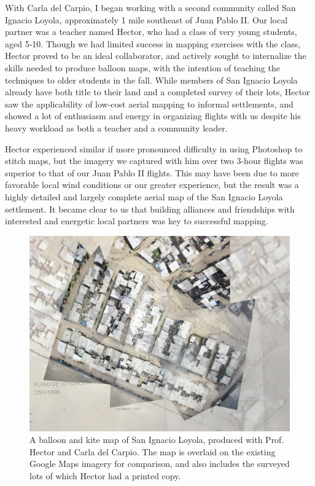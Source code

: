 \documentclass[11pt,oneside,notitlepage]{report}
\begin{document}
{{With Carla del Carpio, I began working with a second community called San Ignacio Loyola, approximately 1 mile southeast of Juan Pablo II. Our local partner was a teacher named Hector, who had a class of very young students, aged 5-10. Though we had limited success in mapping exercises with the class, Hector proved to be an ideal collaborator, and actively sought to internalize the skills needed to produce balloon maps, with the intention of teaching the techniques to older students in the fall. While members of San Ignacio Loyola already have both title to their land and a completed survey of their lots, Hector saw the applicability of low-cost aerial mapping to informal settlements, and showed a lot of enthusiasm and energy in organizing flights with us despite his heavy workload as both a teacher and a community leader. 

Hector experienced similar if more pronounced difficulty in using Photoshop to stitch maps, but the imagery we captured with him over two 3-hour flights was superior to that of our Juan Pablo II flights. This may have been due to more favorable local wind conditions or our greater experience, but the result was a highly detailed and largely complete aerial map of the San Ignacio Loyola settlement. It became clear to us that building alliances and friendships with interested and energetic local partners was key to successful mapping.

\begin{figure}[h]
  \begin{center}
	\includegraphics[width=1\textwidth]{images/san-ignacio-loyola-map.jpg}
	\caption{A balloon and kite map of San Ignacio Loyola, produced with Prof. Hector and Carla del Carpio. The map is overlaid on the existing Google Maps imagery for comparison, and also includes the surveyed lots of which Hector had a printed copy.}
  \end{center}
\end{figure}

}}
\end{document}
